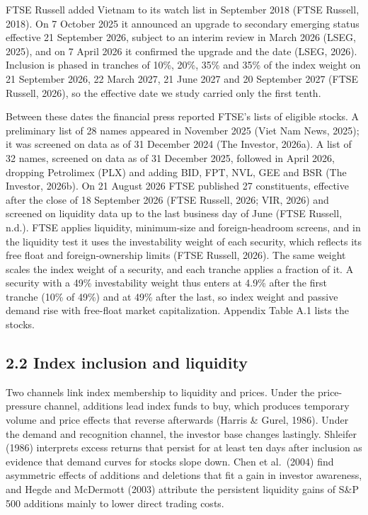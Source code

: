 FTSE Russell added Vietnam to its watch list in September 2018 (FTSE
Russell, 2018). On 7 October 2025 it announced an upgrade to secondary
emerging status effective 21 September 2026, subject to an interim
review in March 2026 (LSEG, 2025), and on 7 April 2026 it confirmed the
upgrade and the date (LSEG, 2026). Inclusion is phased in tranches of
10\%, 20\%, 35\% and 35\% of the index weight on 21 September 2026, 22
March 2027, 21 June 2027 and 20 September 2027 (FTSE Russell, 2026), so
the effective date we study carried only the first tenth.

Between these dates the financial press reported FTSE's lists of
eligible stocks. A preliminary list of 28 names appeared in November
2025 (Viet Nam News, 2025); it was screened on data as of 31 December
2024 (The Investor, 2026a). A list of 32 names, screened on data as of
31 December 2025, followed in April 2026, dropping Petrolimex (PLX) and
adding BID, FPT, NVL, GEE and BSR (The Investor, 2026b). On 21 August
2026 FTSE published 27 constituents, effective after the close of 18
September 2026 (FTSE Russell, 2026; VIR, 2026) and screened on liquidity
data up to the last business day of June (FTSE Russell, n.d.). FTSE
applies liquidity, minimum-size and foreign-headroom screens, and in the
liquidity test it uses the investability weight of each security, which
reflects its free float and foreign-ownership limits (FTSE Russell,
2026). The same weight scales the index weight of a security, and each
tranche applies a fraction of it. A security with a 49\% investability
weight thus enters at 4.9\% after the first tranche (10\% of 49\%) and
at 49\% after the last, so index weight and passive demand rise with
free-float market capitalization. Appendix Table A.1 lists the stocks.

\hypertarget{index-inclusion-and-liquidity}{%
\subsection{2.2 Index inclusion and
liquidity}\label{index-inclusion-and-liquidity}}

Two channels link index membership to liquidity and prices. Under the
price-pressure channel, additions lead index funds to buy, which
produces temporary volume and price effects that reverse afterwards
(Harris \& Gurel, 1986). Under the demand and recognition channel, the
investor base changes lastingly. Shleifer (1986) interprets excess
returns that persist for at least ten days after inclusion as evidence
that demand curves for stocks slope down. Chen et al.~(2004) find
asymmetric effects of additions and deletions that fit a gain in
investor awareness, and Hegde and McDermott (2003) attribute the
persistent liquidity gains of S\&P 500 additions mainly to lower direct
trading costs.

